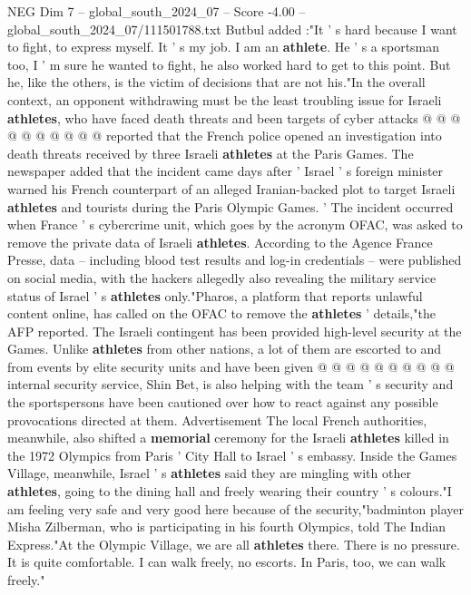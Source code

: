 \begin{textsample}{NEG Dim 7 – global\_south\_2024\_07 – Score -4.00 – global\_south\_2024\_07/111501788.txt}
Butbul added :"It ' s hard because I want to fight, to express myself.
It ' s my job.
I am an \textbf{athlete}.
He ' s a sportsman too, I ' m sure he wanted to fight, he also worked hard to get to this point.
But he, like the others, is the victim of decisions that are not his."In the overall context, an opponent withdrawing must be the least troubling issue for Israeli \textbf{athletes}, who have faced death threats and been targets of cyber attacks @ @ @ @ @ @ @ @ @ @ reported that the French police opened an investigation into death threats received by three Israeli \textbf{athletes} at the Paris Games.
The newspaper added that the incident came days after ' Israel ' s foreign minister warned his French counterpart of an alleged Iranian-backed plot to target Israeli \textbf{athletes} and tourists during the Paris Olympic Games. ' The incident occurred when France ' s cybercrime unit, which goes by the acronym OFAC, was asked to remove the private data of Israeli \textbf{athletes}.
According to the Agence France Presse, data -- including blood test results and log-in credentials -- were published on social media, with the hackers allegedly also revealing the military service status of Israel ' s \textbf{athletes} only."Pharos, a platform that reports unlawful content online, has called on the OFAC to remove the \textbf{athletes} ' details,"the AFP reported.
The Israeli contingent has been provided high-level security at the Games.
Unlike \textbf{athletes} from other nations, a lot of them are escorted to and from events by elite security units and have been given @ @ @ @ @ @ @ @ @ @ internal security service, Shin Bet, is also helping with the team ' s security and the sportspersons have been cautioned over how to react against any possible provocations directed at them.
Advertisement The local French authorities, meanwhile, also shifted a \textbf{memorial} ceremony for the Israeli \textbf{athletes} killed in the 1972 Olympics from Paris ' City Hall to Israel ' s embassy.
Inside the Games Village, meanwhile, Israel ' s \textbf{athletes} said they are mingling with other \textbf{athletes}, going to the dining hall and freely wearing their country ' s colours."I am feeling very safe and very good here because of the security,"badminton player Misha Zilberman, who is participating in his fourth Olympics, told The Indian Express."At the Olympic Village, we are all \textbf{athletes} there.
There is no pressure.
It is quite comfortable.
I can walk freely, no escorts.
In Paris, too, we can walk freely."

\end{textsample}

